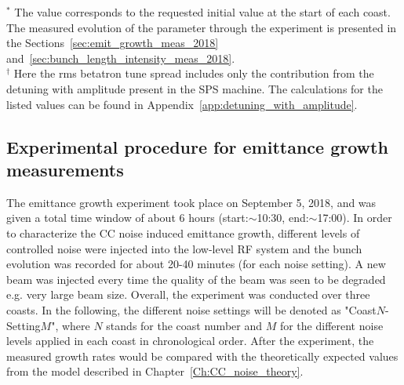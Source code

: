 \begin{table}[!hbt]
\begin{minipage}{\textwidth}
\begin{centering}
\begin{tabu}
      \bottomrule
	\end{tabu}
   \label{tab:machine_beam_param_2018}
   \end{centering} \footnotesize{$^\ast$ The value corresponds to the requested initial value at the start of each coast. The measured evolution of the parameter through the experiment is presented in the Sections~\ref{sec:emit_growth_meas_2018} and~\ref{sec:bunch_length_intensity_meas_2018}.\\$^\dagger$ Here the rms betatron tune spread includes only the contribution from the detuning with amplitude present in the SPS machine. The calculations for the listed values can be found in Appendix~\ref{app:detuning_with_amplitude}.}
   \end{minipage}
\end{table}


\subsection{Experimental procedure for emittance growth measurements}\label{sec:experimental_procedure_2018}
The emittance growth experiment took place on September 5, 2018, and was given a total time window of about 6 hours (start:$\sim$10:30, end:$\sim$17:00). In order to characterize the CC noise induced emittance growth, different levels of controlled noise were injected into the low-level RF system and the bunch evolution was recorded for about 20-40 minutes (for each noise setting). A new beam was injected every time the quality of the beam was seen to be degraded e.g. very large beam size. Overall, the experiment was conducted over three coasts.  In the following, the different noise settings will be denoted as "Coast$N$-Setting$M$", where $N$ stands for the coast number and $M$ for the different noise levels applied in each coast in chronological order. After the experiment, the measured growth rates would be compared with the theoretically expected values from the model described in Chapter~\ref{Ch:CC_noise_theory}.

